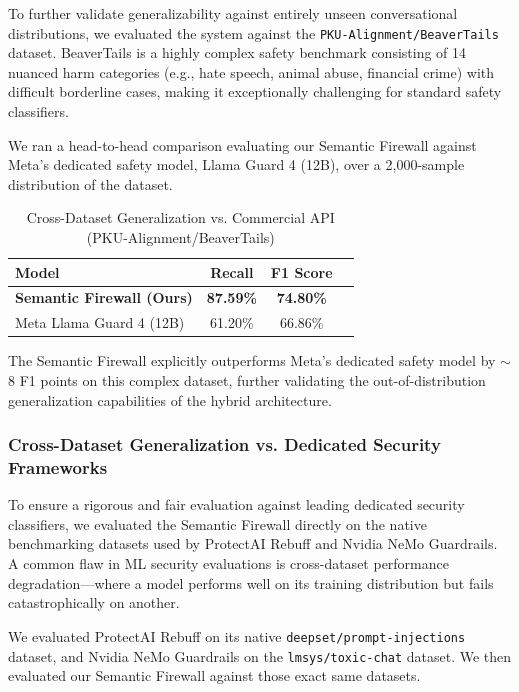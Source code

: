 \documentclass[12pt,a4paper]{article}
\begin{document}
To further validate generalizability against entirely unseen conversational distributions, we evaluated the system against the \texttt{PKU-Alignment/BeaverTails} dataset. BeaverTails is a highly complex safety benchmark consisting of 14 nuanced harm categories (e.g., hate speech, animal abuse, financial crime) with difficult borderline cases, making it exceptionally challenging for standard safety classifiers.

We ran a head-to-head comparison evaluating our Semantic Firewall against Meta's dedicated safety model, Llama Guard 4 (12B), over a 2,000-sample distribution of the dataset.

\begin{table}[H]
\centering
\caption{Cross-Dataset Generalization vs. Commercial API (PKU-Alignment/BeaverTails)}
\label{tab:beavertails}
\begin{tabular}{@{}lccc@{}}
\toprule
\textbf{Model} & \textbf{Recall} & \textbf{F1 Score} \\
\midrule
\textbf{Semantic Firewall (Ours)} & \textbf{87.59\%} & \textbf{74.80\%} \\
Meta Llama Guard 4 (12B) & 61.20\% & 66.86\% \\
\bottomrule
\end{tabular}
\end{table}

The Semantic Firewall explicitly outperforms Meta's dedicated safety model by $\sim$8 F1 points on this complex dataset, further validating the out-of-distribution generalization capabilities of the hybrid architecture.

\subsubsection{Cross-Dataset Generalization vs. Dedicated Security Frameworks}

To ensure a rigorous and fair evaluation against leading dedicated security classifiers, we evaluated the Semantic Firewall directly on the native benchmarking datasets used by ProtectAI Rebuff and Nvidia NeMo Guardrails. A common flaw in ML security evaluations is cross-dataset performance degradation---where a model performs well on its training distribution but fails catastrophically on another.

We evaluated ProtectAI Rebuff on its native \texttt{deepset/prompt-injections} dataset, and Nvidia NeMo Guardrails on the \texttt{lmsys/toxic-chat} dataset. We then evaluated our Semantic Firewall against those exact same datasets.
\end{document}
